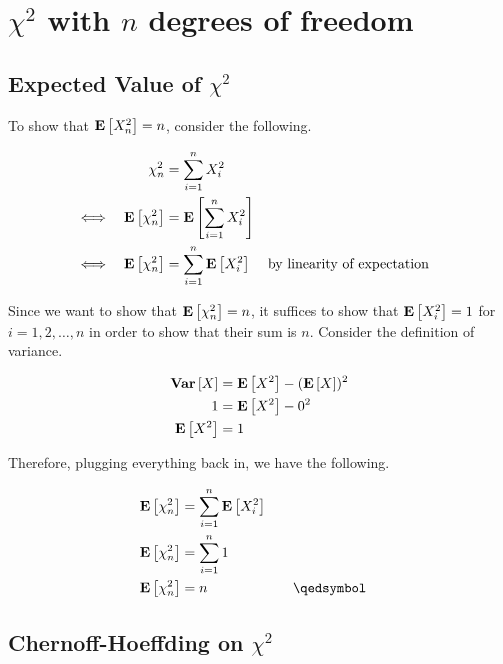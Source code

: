 \chapter{$\chi^2$ with $n$ degrees of freedom}

\section{Expected Value of $\chi^2$}

To show that $\mathbf{E}\left[X_n^2\right] = n$, consider the following.

\begin{equation*}
\begin{aligned}
	&& \chi^2_n &= \sum_{i=1}^n X_i^2 \\
	\iff && \mathbf{E}\left[\chi^2_n\right] &= \mathbf{E}\left[\sum_{i=1}^n X_i^2\right] \\
	\iff && \mathbf{E}\left[\chi^2_n\right] &= \sum_{i=1}^n \mathbf{E}\left[X_i^2\right] && \text{by linearity of expectation}
\end{aligned}
\end{equation*}

Since we want to show that $\mathbf{E}\left[\chi^2_n\right] = n$, it suffices to show that $\mathbf{E}\left[X_i^2\right] = 1$ for $i = 1, 2, \ldots, n$ in order to show that their sum is $n$. Consider the definition of variance.

\begin{equation*}
\begin{aligned}
	\mathbf{Var}\left[X\right] &= \mathbf{E}\left[X^2\right] - (\mathbf{E}\left[X\right])^2 \\
	1 &= \mathbf{E}\left[X^2\right] - 0^2 \\
	\mathbf{E}\left[X^2\right] &= 1
\end{aligned}
\end{equation*}

Therefore, plugging everything back in, we have the following.

\begin{equation*}
\begin{aligned}
	\ex{\chi^2_n} &= \sum_{i=1}^n \ex{X_i^2} \\
	\ex{\chi^2_n} &= \sum_{i=1}^n 1 \\
	\ex{\chi^2_n} &= n &&\quad\qedsymbol \\
\end{aligned}
\end{equation*}

\section{Chernoff-Hoeffding on $\chi^2$}

